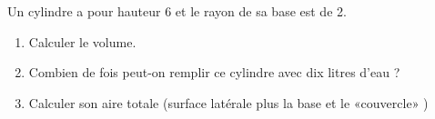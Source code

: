 
\begin{exercice}\label{exosmath-0009}

    Un cylindre a pour hauteur \unit{6}{\centi\meter} et le rayon de sa base est de \unit{2}{\centi\meter}.
    \begin{enumerate}
        \item
            Calculer le volume.
        \item
            Combien de fois peut-on remplir ce cylindre avec dix litres d'eau ?
        \item
            Calculer son aire totale (surface latérale plus la base et le «couvercle» )
    \end{enumerate}

\end{exercice}
